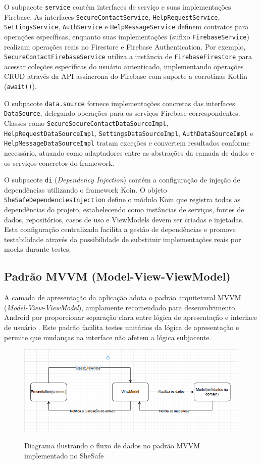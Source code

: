 O subpacote \texttt{service} contém interfaces de serviço e suas implementações Firebase. As interfaces \texttt{SecureContactService}, \texttt{HelpRequestService}, \texttt{SettingsService}, \texttt{AuthService} e \texttt{HelpMessageService} definem contratos para operações específicas, enquanto suas implementações (sufixo \texttt{FirebaseService}) realizam operações reais no Firestore e Firebase Authentication. Por exemplo, \texttt{SecureContactFirebaseService} utiliza a instância de \texttt{FirebaseFirestore} para acessar coleções específicas do usuário autenticado, implementando operações CRUD através da API assíncrona do Firebase com suporte a corrotinas Kotlin (\texttt{await()}).

O subpacote \texttt{data.source} fornece implementações concretas das interfaces \texttt{DataSource}, delegando operações para os serviços Firebase correspondentes. Classes como \texttt{SecureSecureContactDataSourceImpl}, \texttt{HelpRequestDataSourceImpl}, \texttt{SettingsDataSourceImpl}, \texttt{AuthDataSourceImpl} e \texttt{HelpMessageDataSourceImpl} tratam exceções e convertem resultados conforme necessário, atuando como adaptadores entre as abstrações da camada de dados e os serviços concretos do framework.

O subpacote \texttt{di} (\textit{Dependency Injection}) contém a configuração de injeção de dependências utilizando o framework Koin. O objeto \texttt{SheSafeDependenciesInjection} define o módulo Koin que registra todas as dependências do projeto, estabelecendo como instâncias de serviços, fontes de dados, repositórios, casos de uso e ViewModels devem ser criadas e injetadas. Esta configuração centralizada facilita a gestão de dependências e promove testabilidade através da possibilidade de substituir implementações reais por mocks durante testes.

\subsection{Padrão MVVM (Model-View-ViewModel)}
A camada de apresentação da aplicação adota o padrão arquitetural MVVM (\textit{Model-View-ViewModel}), amplamente recomendado para desenvolvimento Android por proporcionar separação clara entre lógica de apresentação e interface de usuário \cite{microsoft2023mvvm}. Este padrão facilita testes unitários da lógica de apresentação e permite que mudanças na interface não afetem a lógica subjacente.
\begin{figure}[htbp]
	\centering
	 \includegraphics[width=0.8\linewidth]{images/shesafe/diagrama-mvvm.png}\\
	\caption{Diagrama ilustrando o fluxo de dados no padrão MVVM implementado no SheSafe}
	\label{fig:mvvm_fluxo}
\end{figure}

